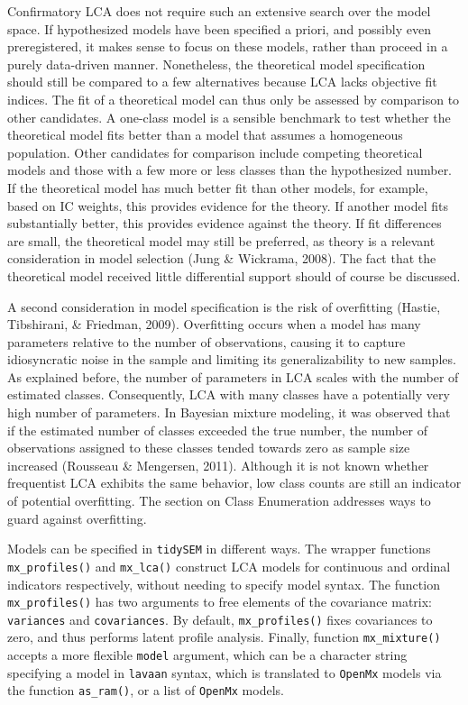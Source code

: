 \documentclass[
  ,man,floatsintext]{apa6}
\begin{document}
Confirmatory LCA does not require such an extensive search over the model space.
If hypothesized models have been specified a priori,
and possibly even preregistered,
it makes sense to focus on these models, rather than proceed in a purely data-driven manner.
Nonetheless, the theoretical model specification should still be compared to a few alternatives because LCA lacks objective fit indices.
The fit of a theoretical model can thus only be assessed by comparison to other candidates.
A one-class model is a sensible benchmark
to test whether the theoretical model fits better than a model that assumes a homogeneous population.
Other candidates for comparison include competing theoretical models and those with a few more or less classes than the hypothesized number.
If the theoretical model has much better fit than other models,
for example, based on IC weights,
this provides evidence for the theory.
If another model fits substantially better,
this provides evidence against the theory.
If fit differences are small, the theoretical model may still be preferred, as theory is a relevant consideration in model selection (Jung \& Wickrama, 2008).
The fact that the theoretical model received little differential support should of course be discussed.

A second consideration in model specification is the risk of overfitting (Hastie, Tibshirani, \& Friedman, 2009).
Overfitting occurs when a model has many parameters relative to the number of observations,
causing it to capture idiosyncratic noise in the sample and limiting its generalizability to new samples.
As explained before, the number of parameters in LCA scales with the number of estimated classes.
Consequently, LCA with many classes have a potentially very high number of parameters.
In Bayesian mixture modeling,
it was observed that if the estimated number of classes exceeded the true number, the number of observations assigned to these classes tended towards zero as sample size increased (Rousseau \& Mengersen, 2011).
Although it is not known whether frequentist LCA exhibits the same behavior,
low class counts are still an indicator of potential overfitting.
The section on Class Enumeration addresses ways to guard against overfitting.

Models can be specified in \texttt{tidySEM} in different ways.
The wrapper functions \texttt{mx\_profiles()} and \texttt{mx\_lca()} construct LCA models for continuous and ordinal indicators respectively, without needing to specify model syntax.
The function \texttt{mx\_profiles()} has two arguments to free elements of the covariance matrix: \texttt{variances} and \texttt{covariances}.
By default, \texttt{mx\_profiles()} fixes covariances to zero, and thus performs latent profile analysis.
Finally, function \texttt{mx\_mixture()} accepts a more flexible \texttt{model} argument, which can be a character string specifying a model in \texttt{lavaan} syntax,
which is translated to \texttt{OpenMx} models via the function \texttt{as\_ram()},
or a list of \texttt{OpenMx} models.
\end{document}
